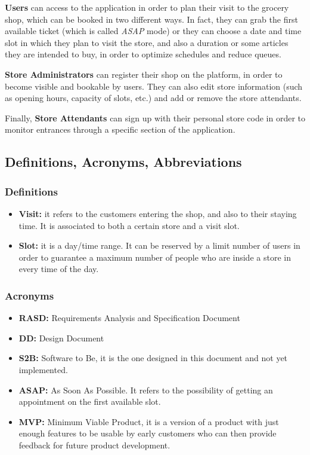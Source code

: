 \documentclass[table, 12pt]{article}
\begin{document}
\textbf{Users} can access to the application in order to plan their visit to the grocery shop, which can be booked in two different ways. In fact, they can grab the first available ticket (which is called \textit{ASAP} mode) or they can choose a date and time slot in which they plan to visit the store, and also a duration or some articles they are intended to buy, in order to optimize schedules and reduce queues.

\textbf{Store Administrators} can register their shop on the platform, in order to become visible and bookable by users. They can also edit store information (such as opening hours, capacity of slots, etc.) and add or remove the store attendants.

Finally, \textbf{Store Attendants} can sign up with their personal store code in order to monitor entrances through a specific section of the application.

\subsection{Definitions, Acronyms, Abbreviations}
\subsubsection{Definitions}
\begin{itemize}
    \item \textbf{Visit:} it refers to the customers entering the shop, and also to their staying time. It is associated to both a certain store and a visit slot.
    \item \textbf{Slot:} it is a day/time range. It can be reserved by a limit number of users in order to guarantee a maximum number of people who are inside a store in every time of the day.
\end{itemize}

\subsubsection{Acronyms}
\begin{itemize}
    \item \textbf{RASD:} Requirements Analysis and Specification Document
    \item \textbf{DD:} Design Document
    \item \textbf{S2B:} Software to Be, it is the one designed in this document and not yet implemented.
    \item {\textbf{ASAP:} As Soon As Possible. It refers to the possibility of getting an appointment on the first available slot.}
    \item \textbf{MVP:} Minimum Viable Product, it is a version of a product with just enough features to be usable by early customers who can then provide feedback for future product development.
\end{itemize}
\end{document}
